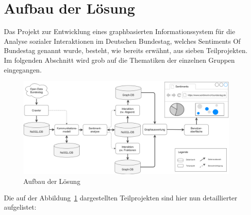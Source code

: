 \section{Aufbau der Lösung}\label{sec:01_02_aufbauLoesung}
Das Projekt zur Entwicklung eines graphbasierten Informationssystem für die Analyse sozialer Interaktionen im Deutschen Bundestag, welches \glqq Sentiments Of Bundestag\grqq{} genannt wurde, besteht, wie bereits erwähnt, aus sieben Teilprojekten. Im folgenden Abschnitt wird grob auf die Thematiken der einzelnen Gruppen eingegangen.

\begin{figure}[H]
    \centering
    \includegraphics[width=\textwidth]{images/01-Einleitung/SentimentOfBundestag.png}
    \caption{Aufbau der Lösung}
    \label{fig:aufbauderLösungSOB}
\end{figure}
Die auf der Abbildung~\ref{fig:aufbauderLösungSOB} dargestellten Teilprojekten sind hier nun detaillierter aufgelistet:
